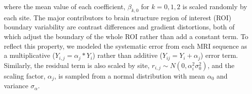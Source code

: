 where the mean value of each coefficient,
$\beta_{k,0}$ for  $k=0,1,2$ is scaled randomly by each site. The major contributors to brain structure region of interest (ROI) boundary variability are contrast differences and gradient distortions, both of which adjust the boundary of the whole ROI rather than add a constant term. To reflect this property, we modeled the systematic error from each MRI sequence as a multiplicative ($Y_{i,j} = \alpha_j*Y_i$) rather than additive ($Y_{ij} = Y_i + \alpha_j$) error term. Similarly, the residual term is also scaled by site, $r_{i,j} \sim N(0,\alpha_i^2\sigma_0^2)$, and the scaling factor, $\alpha_j$, is sampled from a normal distribution with mean $\alpha_0$ and variance $\sigma_{\alpha}$.